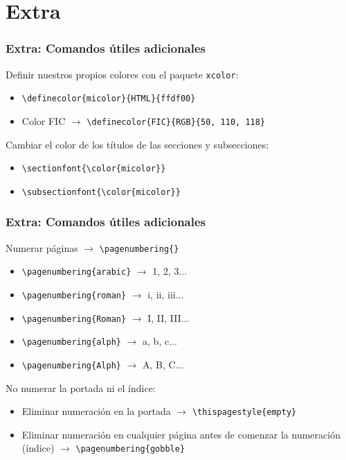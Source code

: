 \section{Extra}


\begin{frame}[fragile]
\frametitle{Extra: Comandos útiles adicionales}

\vspace{0.5cm}

Definir nuestros propios colores con el paquete \verb|xcolor|:
\begin{itemize}
    \item \verb|\definecolor{micolor}{HTML}{ffdf00}|
    \item Color FIC $\rightarrow$ \verb|\definecolor{FIC}{RGB}{50, 110, 118}|
\end{itemize}

\vspace{0.5cm} 

Cambiar el color de los títulos de las secciones y subsecciones:
\begin{itemize}
    \item \verb|\sectionfont{\color{micolor}}|
    \item \verb|\subsectionfont{\color{micolor}}|
\end{itemize}

\end{frame}

\begin{frame}[fragile]
\frametitle{Extra: Comandos útiles adicionales}

Numerar páginas $\rightarrow$ \verb|\pagenumbering{}|
\begin{itemize}
    \item \verb|\pagenumbering{arabic}| $\rightarrow$ 1, 2, 3...
    \item \verb|\pagenumbering{roman}| $\rightarrow$ i, ii, iii...
    \item \verb|\pagenumbering{Roman}| $\rightarrow$ I, II, III...
    \item \verb|\pagenumbering{alph}| $\rightarrow$ a, b, c...
    \item \verb|\pagenumbering{Alph}| $\rightarrow$ A, B, C...
\end{itemize}

\vspace{0.5cm}

No numerar la portada ni el índice:
\begin{itemize}
    \item Eliminar numeración en la portada $\rightarrow$ \verb|\thispagestyle{empty}|
    \item Eliminar numeración en cualquier página antes de comenzar la numeración (índice) $\rightarrow$ \verb|\pagenumbering{gobble}|
\end{itemize}

\end{frame}

